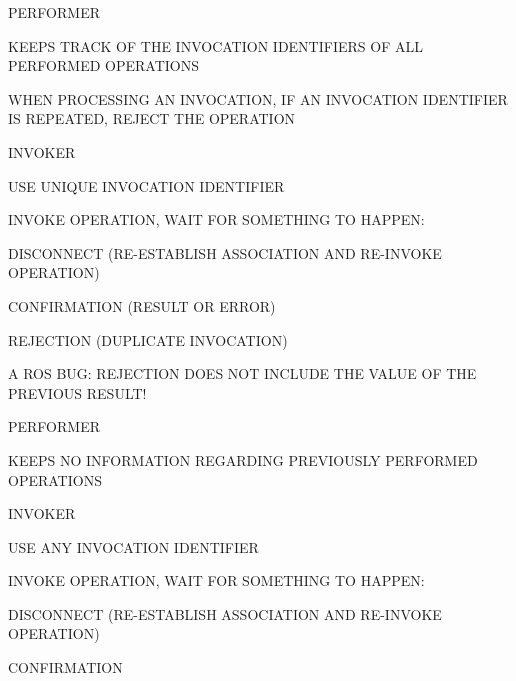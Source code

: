 \begin{bwslide}

\begin{nrtc}
\item	PERFORMER
    \begin{nrtc}
    \item	KEEPS TRACK OF THE INVOCATION IDENTIFIERS OF ALL PERFORMED
		OPERATIONS

    \item	WHEN PROCESSING AN INVOCATION, IF AN INVOCATION IDENTIFIER IS
		REPEATED, REJECT THE OPERATION 
    \end{nrtc}

\item	INVOKER
    \begin{nrtc}
    \item	USE UNIQUE INVOCATION IDENTIFIER

    \item	INVOKE OPERATION, WAIT FOR SOMETHING TO HAPPEN:
	\begin{nrtc}
	\item	DISCONNECT (RE-ESTABLISH ASSOCIATION AND RE-INVOKE OPERATION)

	\item	CONFIRMATION (RESULT OR ERROR)

	\item	REJECTION (DUPLICATE INVOCATION)
	\end{nrtc}
    \end{nrtc}

\item	A ROS BUG: REJECTION DOES NOT INCLUDE THE VALUE OF THE PREVIOUS RESULT!
\end{nrtc}
\end{bwslide}


\begin{bwslide}

\begin{nrtc}
\item	PERFORMER
    \begin{nrtc}
    \item	KEEPS NO INFORMATION REGARDING PREVIOUSLY PERFORMED OPERATIONS
    \end{nrtc}

\item	INVOKER
    \begin{nrtc}
    \item	USE ANY INVOCATION IDENTIFIER

    \item	INVOKE OPERATION, WAIT FOR SOMETHING TO HAPPEN:
	\begin{nrtc}
	\item	DISCONNECT (RE-ESTABLISH ASSOCIATION AND RE-INVOKE OPERATION)

	\item	CONFIRMATION
	\end{nrtc}
    \end{nrtc}
\end{nrtc}
\end{bwslide}


